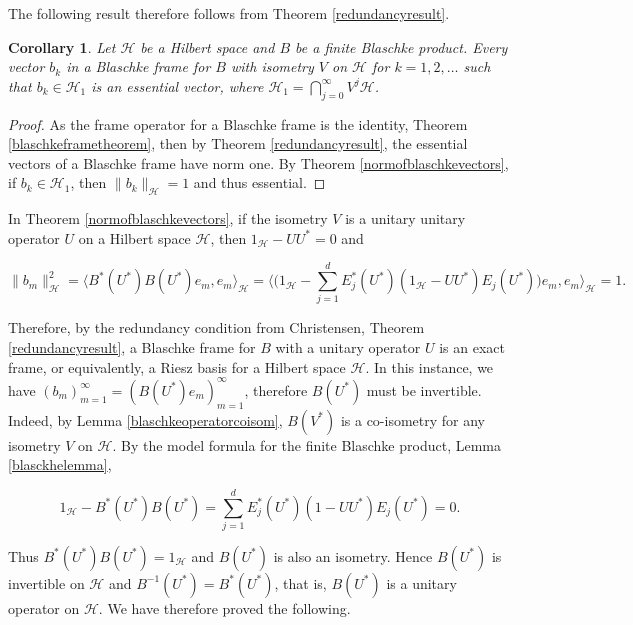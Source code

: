 \documentclass[10pt, reqno]{amsart}
\newtheorem{corollary}[theorem]{Corollary}
\theoremstyle{definition}
\numberwithin{equation}{section}
\begin{document}
\noindent The following result therefore follows from Theorem \ref{redundancyresult}.

\begin{corollary}\label{newcor}
        Let $\mathcal{H}$ be a Hilbert space and $B$ be a finite Blaschke product. Every vector $b_{k}$ in a Blaschke frame for $B$ with isometry $V$ on $\mathcal{H}$ for $k=1,2,\hdots$ such that $b_{k}\in\mathcal{H}_{1}$ is an essential vector, where $\mathcal{H}_{1}=\bigcap_{j=0}^{\infty}V^{j}\mathcal{H}$.
    \end{corollary}

    \begin{proof}
        As the frame operator for a Blaschke frame is the identity, Theorem \ref{blaschkeframetheorem}, then by Theorem \ref{redundancyresult}, the essential vectors of a Blaschke frame have norm one. By Theorem \ref{normofblaschkevectors}, if $b_{k}\in\mathcal{H}_{1}$, then $\|b_{k}\|_{\mathcal{H}}=1$ and thus essential.
    \end{proof}

In Theorem \ref{normofblaschkevectors}, if the isometry $V$ is a unitary unitary operator $U$ on a Hilbert space $\mathcal{H}$, then $1_{\mathcal{H}}-UU^{*}=0$ and 

$$\|b_{m}\|_{\mathcal{H}}^{2}=\Big\langle  B^{*}(U^{*})B(U^{*})e_{m},e_{m}\Big\rangle_{\mathcal{H}}=\bigg\langle  \Big(1_{\mathcal{H}}-\sum_{j=1}^{d}E^{*}_{j}(U^{*})(1_{\mathcal{H}}-UU^{*})E_{j}(U^{*})\Big)e_{m},e_{m}\bigg\rangle_{\mathcal{H}}=1.$$ 

\noindent Therefore, by the redundancy condition from Christensen, Theorem \ref{redundancyresult}, a Blaschke frame for $B$ with a unitary operator $U$ is an exact frame, or equivalently, a Riesz basis for a Hilbert space $\mathcal{H}$. In this instance, we have $(b_{m})_{m=1}^{\infty}=(B(U^{*})e_{m})_{m=1}^{\infty}$, therefore $B(U^{*})$ must be invertible. Indeed, by Lemma \ref{blaschkeoperatorcoisom}, $B(V^{*})$ is a co-isometry for any isometry $V$ on $\mathcal{H}$. By the model formula for the finite Blaschke product, Lemma \ref{blasckhelemma},

$$1_{\mathcal{H}}-B^{*}(U^{*})B(U^{*})=\sum_{j=1}^{d}E^{*}_{j}(U^{*})(1-UU^{*})E_{j}(U^{*})=0.$$

\noindent Thus $B^{*}(U^{*})B(U^{*})=1_{\mathcal{H}}$ and $B(U^{*})$ is also an isometry. Hence $B(U^{*})$ is invertible on $\mathcal{H}$ and $B^{-1}(U^{*})=B^{*}(U^{*})$, that is, $B(U^{*})$ is a unitary operator on $\mathcal{H}$. We have therefore proved the following.
\end{document}
